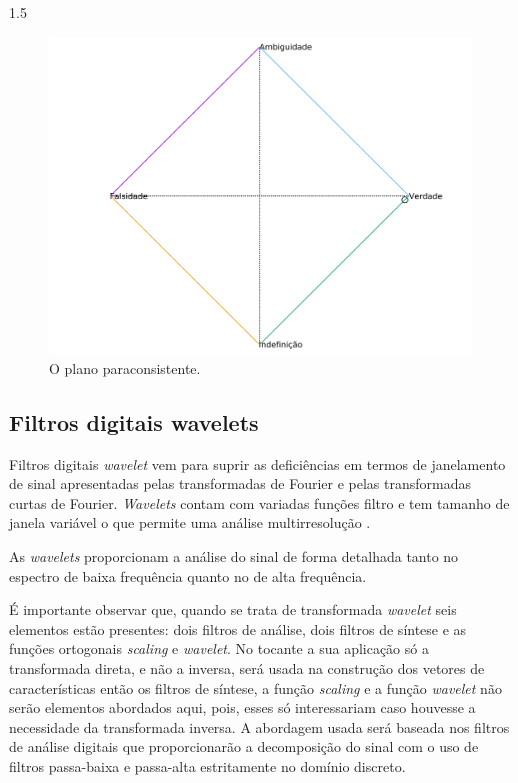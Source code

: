 \documentclass[a4paper,12pt,openright,oneside]{book}
\newenvironment{myenv}[1]
  {\begin{spacing}{#1}}
  {\end{spacing}}
\begin{document}
\begin{myenv}{1.5}
					\begin{figure}[h]
						\centering
						\includegraphics[width=0.69\linewidth]{images/paraconsistentPlane.pdf}
						\caption{O plano paraconsistente.}
						\label{fig:paraconsistentplane}
					\end{figure}

				\subsection{Filtros digitais wavelets}
					\par Filtros digitais \textit{wavelet} vem para suprir as deficiências em termos de janelamento de sinal apresentadas pelas transformadas de Fourier e pelas transformadas curtas de Fourier. \textit{Wavelets} contam com variadas funções filtro e tem tamanho de janela variável o que permite uma análise multirresolução \cite{Rod5254905}.
					
					\par As \textit{wavelets} proporcionam a análise do sinal de forma detalhada tanto no espectro de baixa frequência quanto no de alta frequência.
					
					\par É importante observar que, quando se trata de transformada \textit{wavelet} seis elementos estão presentes: dois filtros de análise, dois filtros de síntese e as funções ortogonais \textit{scaling} e \textit{wavelet}. No tocante a sua aplicação só a transformada direta, e não a inversa, será usada na construção dos vetores de características então os filtros de síntese, a função \textit{scaling} e a função \textit{wavelet} não serão elementos abordados aqui, pois, esses só interessariam caso houvesse a necessidade da transformada inversa. A abordagem usada será baseada nos filtros de análise digitais que proporcionarão a decomposição do sinal com o uso de filtros passa-baixa e passa-alta estritamente no domínio discreto.
		

\end{myenv}
\end{document}
